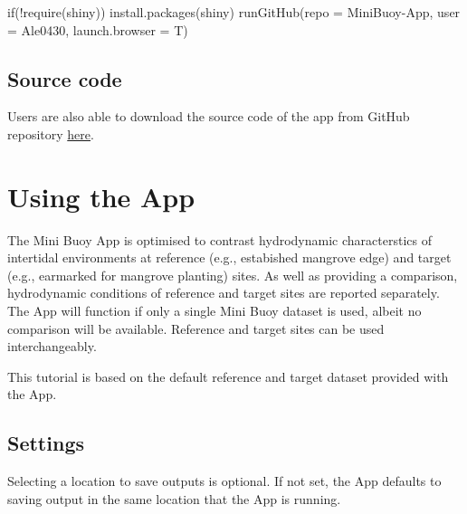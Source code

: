 \documentclass[
  letterpaper,
  DIV=11,
  numbers=noendperiod]{scrreprt}
\newenvironment{Shaded}{\begin{snugshade}}{\end{snugshade}}
\newcommand{\AttributeTok}[1]{\textcolor[rgb]{0.40,0.45,0.13}{#1}}
\newcommand{\ControlFlowTok}[1]{\textcolor[rgb]{0.00,0.23,0.31}{#1}}
\newcommand{\FunctionTok}[1]{\textcolor[rgb]{0.28,0.35,0.67}{#1}}
\newcommand{\NormalTok}[1]{\textcolor[rgb]{0.00,0.23,0.31}{#1}}
\newcommand{\SpecialCharTok}[1]{\textcolor[rgb]{0.37,0.37,0.37}{#1}}
\newcommand{\StringTok}[1]{\textcolor[rgb]{0.13,0.47,0.30}{#1}}
\begin{document}
\begin{Shaded}
\begin{Highlighting}[]
\ControlFlowTok{if}\NormalTok{(}\SpecialCharTok{!}\FunctionTok{require}\NormalTok{(}\StringTok{\textquotesingle{}shiny\textquotesingle{}}\NormalTok{)) }\FunctionTok{install.packages}\NormalTok{(}\StringTok{\textquotesingle{}shiny\textquotesingle{}}\NormalTok{)}
\FunctionTok{runGitHub}\NormalTok{(}\AttributeTok{repo =} \StringTok{\textquotesingle{}MiniBuoy{-}App\textquotesingle{}}\NormalTok{, }\AttributeTok{user =} \StringTok{\textquotesingle{}Ale0430\textquotesingle{}}\NormalTok{, }\AttributeTok{launch.browser =}\NormalTok{ T)}
\end{Highlighting}
\end{Shaded}

\hypertarget{source-code}{%
\subsection{Source code}\label{source-code}}

Users are also able to download the source code of the app from GitHub
repository \href{https://github.com/Ale0430/MiniBuoy-App}{here}.

\hypertarget{using-the-app}{%
\section{Using the App}\label{using-the-app}}

The Mini Buoy App is optimised to contrast hydrodynamic characterstics
of intertidal environments at reference (e.g., estabished mangrove edge)
and target (e.g., earmarked for mangrove planting) sites. As well as
providing a comparison, hydrodynamic conditions of reference and target
sites are reported separately. The App will function if only a single
Mini Buoy dataset is used, albeit no comparison will be available.
Reference and target sites can be used interchangeably.

This tutorial is based on the default reference and target dataset
provided with the App.

\hypertarget{sec-custon}{%
\subsection{Settings}\label{sec-custon}}

Selecting a location to save outputs is optional. If not set, the App
defaults to saving output in the same location that the App is running.
\end{document}
